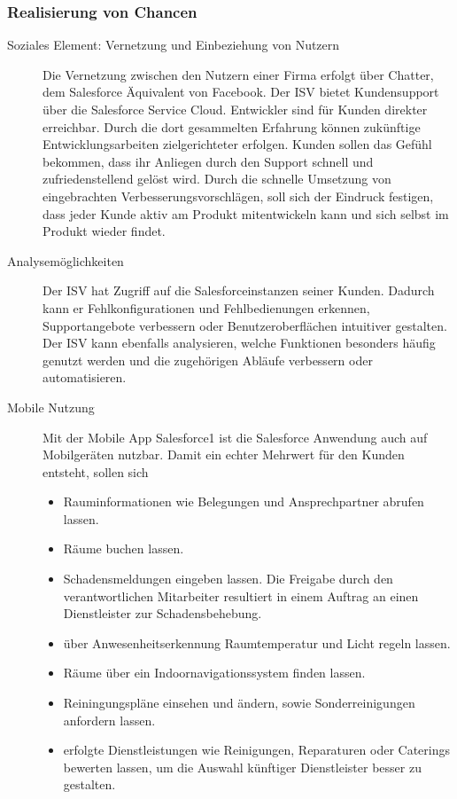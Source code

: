 \subsubsection{Realisierung von Chancen}
\begin{description}
	\item[Soziales Element: Vernetzung und Einbeziehung von Nutzern] Die 
Vernetzung zwischen den Nutzern einer Firma erfolgt über Chatter, dem 
Salesforce Äquivalent von Facebook. Der ISV bietet Kundensupport über die 
Salesforce Service Cloud. Entwickler sind für Kunden direkter erreichbar. Durch 
die dort gesammelten Erfahrung können zukünftige Entwicklungsarbeiten 
zielgerichteter erfolgen. Kunden sollen das Gefühl bekommen, 
dass ihr Anliegen durch den Support schnell und zufriedenstellend gelöst 
wird. Durch die schnelle Umsetzung von eingebrachten 
Verbesserungsvorschlägen, soll sich der Eindruck festigen, dass jeder 
Kunde aktiv am Produkt mitentwickeln kann und sich selbst im Produkt wieder 
findet.
	\item[Analysemöglichkeiten] Der ISV hat Zugriff auf die 
Salesforceinstanzen seiner Kunden. Dadurch kann er Fehlkonfigurationen 
und Fehlbedienungen erkennen, Supportangebote verbessern oder 
Benutzeroberflächen intuitiver gestalten. Der ISV kann ebenfalls analysieren, 
welche Funktionen besonders häufig genutzt werden und die zugehörigen Abläufe 
verbessern oder automatisieren.
	\item[Mobile Nutzung] Mit der Mobile App Salesforce1 ist die Salesforce 
Anwendung auch auf Mobilgeräten nutzbar. Damit ein echter Mehrwert für 
den Kunden entsteht, sollen sich
\begin{itemize}
	\item Rauminformationen wie Belegungen und Ansprechpartner abrufen 
lassen.
	\item Räume buchen lassen.
	\item Schadensmeldungen eingeben lassen. Die Freigabe durch den 
verantwortlichen Mitarbeiter resultiert in einem Auftrag an einen Dienstleister 
zur Schadensbehebung.
	\item über Anwesenheitserkennung Raumtemperatur und Licht regeln lassen.
	\item Räume über ein Indoornavigationssystem finden lassen.
	\item Reiningungspläne einsehen und ändern, sowie Sonderreinigungen 
anfordern lassen.
	\item erfolgte Dienstleistungen wie Reinigungen, Reparaturen oder 
Caterings bewerten lassen, um die Auswahl künftiger Dienstleister besser zu 
gestalten.
\end{itemize}


\end{description}
